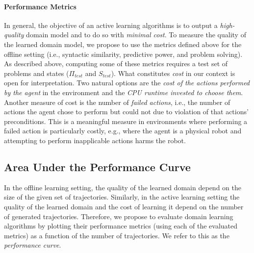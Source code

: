 \documentclass[letterpaper]{article} %
\newcommand{\stest}{\ensuremath{S_{\textit{test}}}\xspace}
\newcommand{\ptest}{\ensuremath{\Pi_{\textit{test}}}\xspace}
\begin{document}
\paragraph{Performance Metrics}
In general, the objective of an active learning algorithms is to output a \emph{high-quality} domain model and to do so with \emph{minimal cost}. 
To measure the quality of the learned domain model, we propose to use the metrics defined above for the 
 offline setting (i.e., syntactic similarity, predictive power, and problem solving). As described above, computing some of these metrics requires a test set of problems and states ($\ptest$ and $\stest$). 
What constitutes \emph{cost} in our context is open for interpretation. 
Two natural options are the \emph{cost of the actions performed by the agent} in the environment 
and the \emph{CPU runtime invested to choose them}. 
Another measure of cost is the number of \emph{failed actions}, i.e., the number of actions the agent chose to perform but could not due to violation of that actions' preconditions. 
This is a meaningful measure in environments where performing a failed action is particularly costly, e.g., where the agent is a physical robot and attempting to perform inapplicable actions harms the robot. 


%
\subsection{Area Under the Performance Curve} 
In the offline learning setting, the quality of the learned domain depend on the size of the given set of trajectories. Similarly, in the active learning setting the quality of the learned domain and the cost of learning it depend on the number of generated trajectories. 
Therefore, we propose to evaluate domain learning algorithms by plotting their performance metrics (using each of the evaluated metrics) as a function of the number of trajectories. We refer to this as the \emph{performance curve}. 
\end{document}
